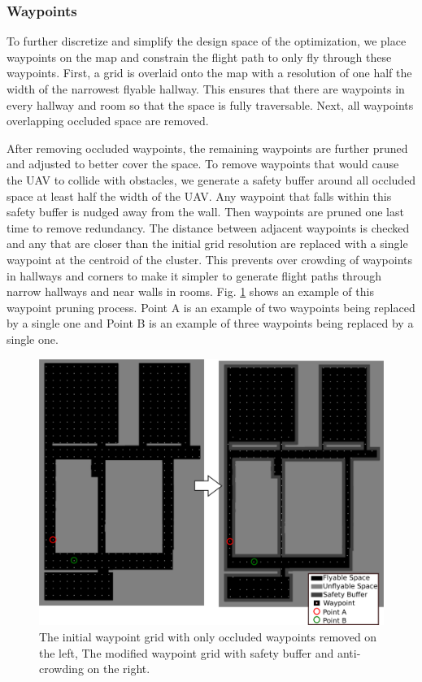 \documentclass[letterpaper, 10 pt, conference]{ieeeconf}  %
\begin{document}
\subsubsection{Waypoints}

To further discretize and simplify the design space of the optimization, we place waypoints on the map and constrain the flight path to only fly through these waypoints. First, a grid is overlaid onto the map with a resolution of one half the width of the narrowest flyable hallway. This ensures that there are waypoints in every hallway and room so that the space is fully traversable. Next, all waypoints overlapping occluded space are removed.

After removing occluded waypoints, the remaining waypoints are further pruned and adjusted to better cover the space. To remove waypoints that would cause the UAV to collide with obstacles, we generate a safety buffer around all occluded space at least half the width of the UAV. Any waypoint that falls within this safety buffer is nudged away from the wall. Then waypoints are pruned one last time to remove redundancy. The distance between adjacent waypoints is checked and any that are closer than the initial grid resolution are replaced with a single waypoint at the centroid of the cluster. This prevents over crowding of waypoints in hallways and corners to make it simpler to generate flight paths through narrow hallways and near walls in rooms. Fig. \ref{fig:waypoints} shows an example of this waypoint pruning process. Point A is an example of two waypoints being replaced by a single one and Point B is an example of three waypoints being replaced by a single one.

\begin{figure}
\centering
\includegraphics[width=0.8\linewidth]{figures/waypoint2.png}
\caption{The initial waypoint grid with only occluded waypoints removed on the left, The modified waypoint grid with safety buffer and anti-crowding on the right.}
\label{fig:waypoints}
\end{figure}
\end{document}
